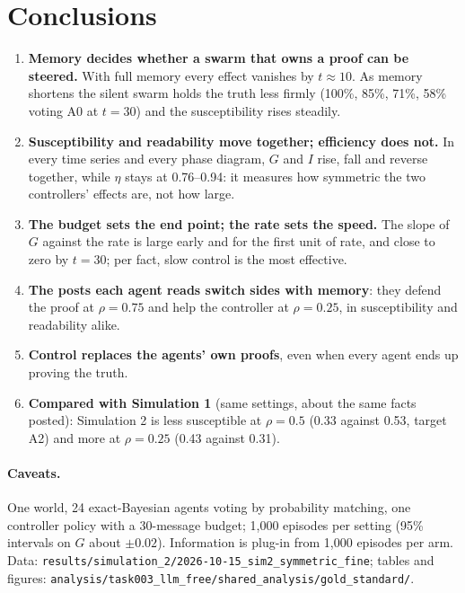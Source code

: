 \documentclass[10pt,a4paper]{article}
\begin{document}
\section{Conclusions}

\begin{enumerate}\itemsep2pt
\item \textbf{Memory decides whether a swarm that owns a proof can be steered.} With full memory every effect
  vanishes by $t \approx 10$. As memory shortens the silent swarm holds the truth less firmly (100\%, 85\%, 71\%,
  58\% voting A0 at $t = 30$) and the susceptibility rises steadily.
\item \textbf{Susceptibility and readability move together; efficiency does not.} In every time series and every
  phase diagram, $G$ and $I$ rise, fall and reverse together, while $\eta$ stays at 0.76--0.94: it measures how
  symmetric the two controllers' effects are, not how large.
\item \textbf{The budget sets the end point; the rate sets the speed.} The slope of $G$ against the rate is large
  early and for the first unit of rate, and close to zero by $t = 30$; per fact, slow control is the most effective.
\item \textbf{The posts each agent reads switch sides with memory}: they defend the proof at $\rho = 0.75$ and help
  the controller at $\rho = 0.25$, in susceptibility and readability alike.
\item \textbf{Control replaces the agents' own proofs}, even when every agent ends up proving the truth.
\item \textbf{Compared with Simulation 1} (same settings, about the same facts posted): Simulation 2 is less
  susceptible at $\rho = 0.5$ (0.33 against 0.53, target A2) and more at $\rho = 0.25$ (0.43 against 0.31).
\end{enumerate}

\paragraph{Caveats.} One world, 24 exact-Bayesian agents voting by probability matching, one controller policy
with a 30-message budget; 1{,}000 episodes per setting (95\% intervals on $G$ about $\pm0.02$). Information is
plug-in from 1{,}000 episodes per arm. Data:
\texttt{results/simulation\_2/2026-10-15\_sim2\_symmetric\_fine}; tables and figures:
\texttt{analysis/task003\_llm\_free/shared\_analysis/gold\_standard/}.
\end{document}

